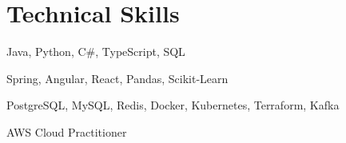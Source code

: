 \documentclass[letterpaper,11pt]{article}
\begin{document}
\section{Technical Skills}
 \begin{description}[leftmargin=!,labelwidth=\widthof{\small\textit{Frameworks \& Libraries:XXX}}, itemsep=0.5pt, parsep=0.5pt]
    \item[\small{Languages:}] \small Java, Python,  C\#, TypeScript, SQL
    \item[\small{Frameworks \& Libraries:}] \small Spring, Angular, React, Pandas, Scikit-Learn
    \item[\small{Tools:}] \small PostgreSQL, MySQL, Redis, Docker, Kubernetes, Terraform, Kafka
  \item[\small{Certifications:}] \small AWS Cloud Practitioner
\end{description}
\vspace{-10pt}

\end{document}
